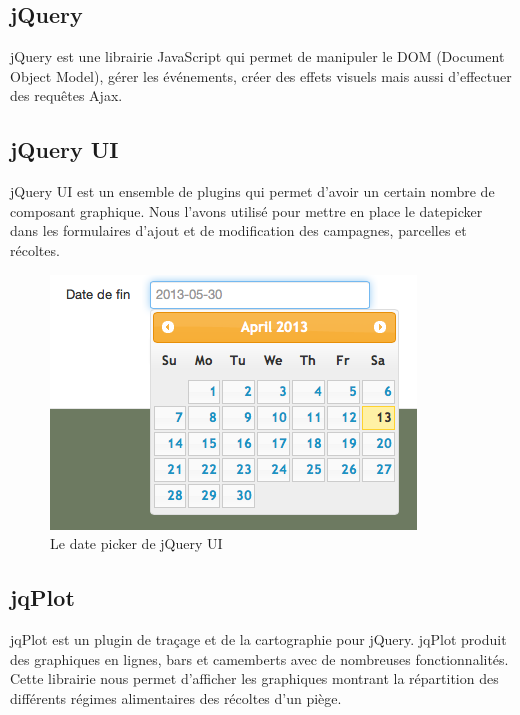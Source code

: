 \documentclass[twoside]{EPURapport}
\begin{document}
		\subsection{jQuery}
		\label{lib:jquery}
		jQuery est une librairie JavaScript qui permet de manipuler le DOM (Document Object Model), gérer les événements, créer des effets visuels mais aussi d'effectuer des requêtes Ajax.
		
		\subsection{jQuery UI}
		\label{lib:jqueryui}
		jQuery UI est un ensemble de plugins qui permet d'avoir un certain nombre de composant graphique. Nous l'avons utilisé pour mettre en place le datepicker dans les formulaires d'ajout et de modification des campagnes, parcelles et récoltes.
		
		\begin{figure}[hbtp]
			\centering
			\includegraphics[scale=0.5]{images/lib-jquery_datePicker.png}
			\caption{Le date picker de jQuery UI}
		\end{figure}
	
		\subsection{jqPlot}
		\label{lib:jqplot}
		jqPlot est un plugin de traçage et de la cartographie pour jQuery. jqPlot produit des graphiques en lignes, bars et camemberts avec de nombreuses fonctionnalités. Cette librairie nous permet d'afficher les graphiques montrant la répartition des différents régimes alimentaires des récoltes d'un piège.
		
\end{document}
